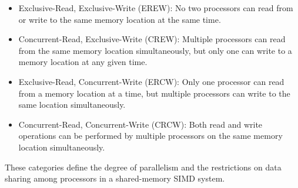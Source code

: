 \documentclass[a4paper, 10pt]{book}
\begin{document}
                    \begin{itemize}
                        
                        \item {\bold Exclusive-Read, Exclusive-Write (EREW):} No two processors can read from or write to the same memory location at the same time.

                        \item {\bold Concurrent-Read, Exclusive-Write (CREW):} Multiple processors can read from the same memory location simultaneously, but only one can write to a memory location at any given time.

                        \item {\bold Exclusive-Read, Concurrent-Write (ERCW):} Only one processor can read from a memory location at a time, but multiple processors can write to the same location simultaneously.

                        \item {\bold Concurrent-Read, Concurrent-Write (CRCW):} Both read and write operations can be performed by multiple processors on the same memory location simultaneously.

                    \end{itemize}
                
                    These categories define the degree of parallelism and the restrictions on data sharing among processors in a shared-memory SIMD system.
\end{document}
